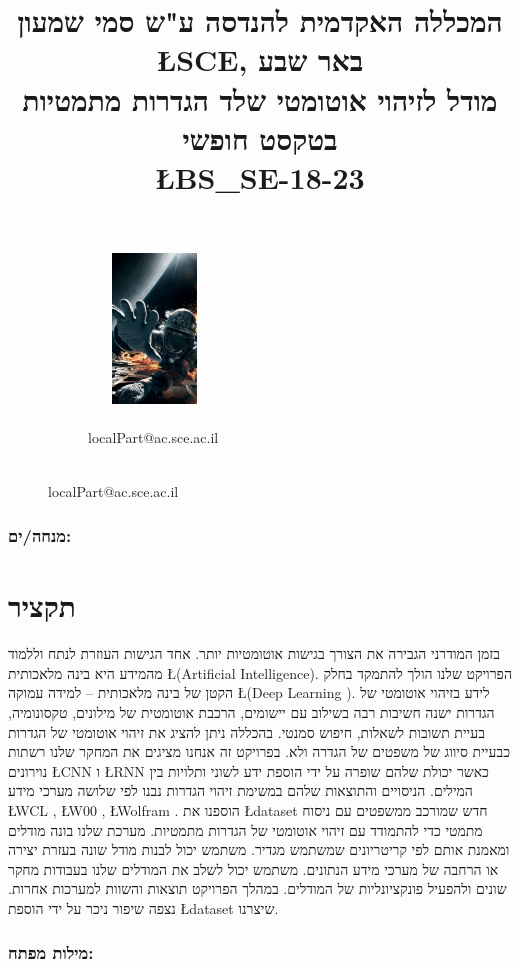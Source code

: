 \documentclass[11pt]{article}
\title{%
\small
המכללה האקדמית להנדסה ע"ש סמי שמעון \L{SCE}, באר שבע\\ \vspace{+1em}
\Large
מודל לזיהוי אוטומטי שלד
הגדרות מתמטיות בטקסט
חופשי\\
\L{BS\_SE-18-23}\vspace{-3.5em}}
\date{}
\date{}
\begin{document}
\maketitle
{}

\begin{figure}[h]
   \centering
    \begin{subfigure}[b]{0.35\textwidth}
        \centering
        \includegraphics[height=40mm, width=35mm]{pic1.jpg}
        \caption*{\\ localPart@ac.sce.ac.il}
    \end{subfigure}
\end{figure}
\thispagestyle{empty}

\subsubsection*{מנחה/ים:}
\section*{תקציר}

בזמן
המודרני הגבירה את הצורך בגישות אוטומטיות יותר. אחד הגישות העוזרת לנתח וללמוד מהמידע
היא בינה מלאכותית \L{(Artificial Intelligence)}. 
הפרויקט שלנו הולך להתמקד בחלק הקטן של
בינה מלאכותית – למידה עמוקה \L{(Deep Learning )}.
לידע בזיהוי אוטומטי של הגדרות ישנה חשיבות רבה בשילוב עם יישומים, הרכבת אוטומטית של
מילונים, טקסונומיה, בעיית תשובות לשאלות, חיפוש סמנטי. בהכללה ניתן להציג את זיהוי אוטומטי
של הגדרות כבעיית סיווג של משפטים של הגדרה ולא.
בפרויקט זה אנחנו מציגים את המחקר שלנו רשתות נוירונים \L{CNN} ו \L{RNN} כאשר יכולת שלהם
שופרה על ידי הוספת ידע לשוני ותלויות בין המילים. הניסויים והתוצאות שלהם במשימת זיהוי
הגדרות נבנו לפי שלושה מערכי מידע \L{WCL} , \L{W00} , \L{Wolfram} .
הוספנו את \L{dataset} חדש שמורכב ממשפטים עם ניסוח מתמטי כדי להתמודד עם זיהוי אוטומטי של
הגדרות מתמטיות.
מערכת שלנו בונה מודלים ומאמנת אותם לפי קריטריונים שמשתמש מגדיר. משתמש יכול לבנות
מודל שונה בעזרת יצירה או הרחבה של מערכי מידע הנתונים.
משתמש יכול לשלב את המודלים שלנו בעבודות מחקר שונים ולהפעיל פונקציונליות של המודלים.
במהלך הפרויקט תוצאות והשוות למערכות אחרות. נצפה שיפור ניכר על ידי הוספת \L{dataset}
שיצרנו.
\subsubsection*{מילות מפתח:}
\end{document}
